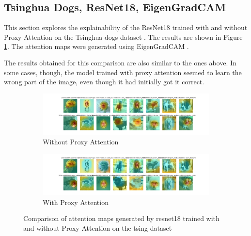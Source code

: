 \subsection{Tsinghua Dogs, ResNet18, EigenGradCAM}
This section explores the explainability of the ResNet18 \cite{heDeepResidualLearning2016} trained with and without Proxy Attention on the Tsinghua dogs dataset \cite{zouNewDatasetDog2020}. The results are shown in Figure \ref{fig:resnet18_tsing}. The attention maps were generated using EigenGradCAM \cite{banymuhammadEigenCAMVisualExplanations2021}.

The results obtained for this comparison are also similar to the ones above. In some cases, though, the model trained with proxy attention seemed to learn the wrong part of the image, even though it had initially got it correct.

\begin{figure}[!htb]
    \begin{subfigure}[b]{1\textwidth}
        \includegraphics[width=\linewidth]{images/tsing_resnet18_noproxy_0.pdf}
        \caption{Without Proxy Attention}
    \end{subfigure}
    \begin{subfigure}[b]{1\textwidth}
        \includegraphics[width=\linewidth]{images/tsing_resnet18_proxy_0.pdf}
        \caption{With Proxy Attention}
    \end{subfigure}
    \caption{Comparison of attention maps generated by resnet18 trained with and without Proxy Attention on the tsing dataset}
    \label{fig:resnet18_tsing}
\end{figure}




